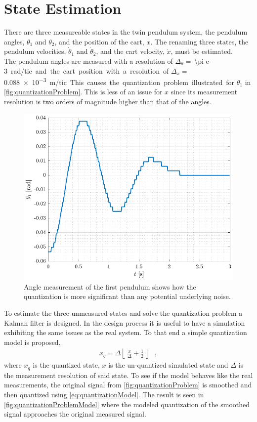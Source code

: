 %
\chapter{State Estimation}
There are three measureable states in the twin pendulum system, the pendulum angles, $\theta_1$ and $\theta_2$, and the position of the cart, $x$. The renaming three states, the pendulum velocities, $\dot{\theta}_1$ and $\dot{\theta}_2$, and the cart velocity, $\dot{x}$, must be estimated.\\
The pendulum angles are measured with a resolution of $\Delta_\theta =\ $\SI{\pi e-3} rad/tic and the cart position with a resolution of $\Delta_x =\ $\SI{0.088e-3} m/tic. This causes the quantization problem illustrated for $\theta_1$ in \autoref{fig:quantizationProblem}. This is less of an issue for $x$ since its measurement resolution is two orders of magnitude higher than that of the angles.
%
\begin{figure}[H]
  \includegraphics[width=.7\textwidth]{figures/quantizationProblem}
  \caption{Angle measurement of the first pendulum shows how the quantization is more significant than any potential underlying noise.}
  \label{fig:quantizationProblem}
\end{figure}
%
To estimate the three unmeasured states and solve the quantization problem a Kalman filter is designed. In the design process it is useful to have a simulation exhibiting the same issues as the real system. To that end a simple quantization model is proposed,
\begin{align}
x_q = \Delta \left\lfloor\ \frac{x}{\Delta} + \frac{1}{2}\ \right\rfloor \ \ \ ,   \label{eq:quantizationModel}
\end{align}
where $x_q$ is the quantized state, $x$ is the un-quantized simulated state and $\Delta$ is the measurement resolution of said state. To see if the model behaves like the real measurements, the original signal from \autoref{fig:quantizationProblem} is smoothed and then quantized using \autoref{eq:quantizationModel}. The result is seen in \autoref{fig:quantizationProblemModel} where the modeled quantization of the smoothed signal approaches the original measured signal.
